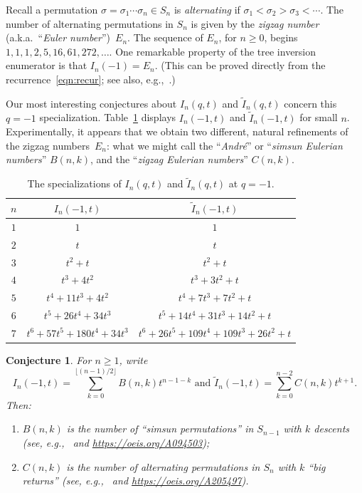 \documentclass[11pt]{amsart}
\newtheorem{conj}[thm]{Conjecture}
\begin{document}
Recall a permutation $\sigma=\sigma_1\cdots\sigma_n\in S_n$ is \emph{alternating} if $\sigma_1 < \sigma_2 > \sigma_3 < \cdots$. The number of alternating permutations in $S_n$ is given by the \emph{zigzag number} (a.k.a.~``\emph{Euler number}'')~$E_n$. The sequence of $E_n$, for $n \geq 0$, begins $1, 1, 1, 2, 5, 16, 61, 272,  \ldots$. One remarkable property of the tree inversion enumerator is that $I_n(-1) = E_n$. (This can be proved directly from the recurrence~\eqref{eqn:recur}; see also, e.g.,~\cite{kuznetsov1994increasing}.)

Our most interesting conjectures about $I_n(q,t)$ and $\widetilde{I}_n(q,t)$ concern this $q=-1$ specialization. Table~\ref{tab:minusone} displays $I_n(-1,t)$ and $\widetilde{I}_n(-1,t)$ for small $n$. Experimentally, it appears that we obtain two different, natural refinements of the zigzag numbers~$E_n$: what we might call the ``\emph{Andr\'{e}}'' or ``\emph{simsun Eulerian numbers}'' $B(n,k)$, and the ``\emph{zigzag Eulerian numbers}'' $C(n,k)$.

\begin{table}
\begin{center}
\renewcommand{\arraystretch}{1.25}
\begin{tabular}{ c|c|c } 
$n$ & $I_n(-1,t)$ & $\widetilde{I}_n(-1,t)$ \\ \hline
$1$ & $1$ & $1$ \\ \hline
$2$ & $t$ & $t$ \\ \hline
$3$ & $t^2+t$ & $t^2+t$ \\ \hline
$4$ & $t^3 + 4t^2$ & $t^3 + 3t^2 + t$ \\ \hline
$5$ & $t^4 + 11t^3 + 4t^2$ & $t^4 + 7t^3 + 7t^2 + t$ \\ \hline
$6$ & $t^5 + 26t^4 + 34t^3$ & $t^5 + 14t^4 + 31t^3 + 14t^2 + t$ \\ \hline
$7$ & $t^6 + 57t^5 + 180t^4 + 34t^3$ & $t^6 + 26t^5 + 109t^4 + 109t^3 + 26t^2 + t$
\end{tabular}
\end{center}
\caption{The specializations of $I_n(q,t)$ and $\widetilde{I}_n(q,t)$ at $q=-1$.} \label{tab:minusone}
\end{table}

\begin{conj} For $n\geq 1$, write
\[I_n(-1,t)=\sum_{k=0}^{\lfloor (n-1)/2\rfloor}B(n,k)t^{n-1-k} \textrm{ and } \widetilde{I}_n(-1,t)=\sum_{k=0}^{n-2}C(n,k)t^{k+1}.\]
Then:
\begin{enumerate}
\item $B(n,k)$ is the number of ``\emph{simsun permutations}'' in $S_{n-1}$ with $k$ descents (see, e.g.,~\cite{chow2011counting} and \url{https://oeis.org/A094503});
\item $C(n,k)$ is the number of alternating permutations in $S_n$ with $k$ ``\emph{big returns}'' (see, e.g.,~\cite{petersen2025zigzag} and \url{https://oeis.org/A205497}).
\end{enumerate}
\end{conj}
\end{document}
